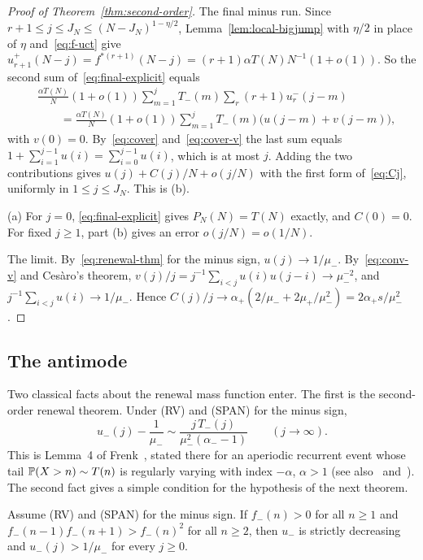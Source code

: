 \begin{proof}[Proof of Theorem~\ref{thm:second-order}]
The final minus run. Since $r+1\le j\le J_N\le(N-J_N)^{1-\eta/2}$,
Lemma~\ref{lem:local-bigjump} with $\eta/2$ in place of $\eta$ and~\eqref{eq:f-uct} give
$u^\plus_{r+1}(N-j)=f^{*(r+1)}(N-j)=(r+1)\alpha T(N)N^{-1}(1+o(1))$. So the second sum
of~\eqref{eq:final-explicit} equals
\begin{align*}
 &\frac{\alpha T(N)}{N}(1+o(1))\sum_{m=1}^{j}T_\minus(m)\sum_r(r+1)u^\minus_r(j-m)\\
 &\qquad=\frac{\alpha T(N)}{N}(1+o(1))\sum_{m=1}^{j}T_\minus(m)\bigl(u(j-m)+v(j-m)\bigr),
\end{align*}
with $v(0)=0$. By~\eqref{eq:cover} and~\eqref{eq:cover-v} the last sum equals
$1+\sum_{i=1}^{j-1}u(i)=\sum_{i=0}^{j-1}u(i)$, which is at most $j$. Adding the two
contributions gives $u(j)+C(j)/N+o(j/N)$ with the first form of~\eqref{eq:Cj}, uniformly
in $1\le j\le J_N$. This is (b).

(a) For $j=0$, \eqref{eq:final-explicit} gives $P_N(N)=T(N)$ exactly, and $C(0)=0$. For
fixed $j\ge1$, part (b) gives an error $o(j/N)=o(1/N)$.

The limit. By~\eqref{eq:renewal-thm} for the minus sign, $u(j)\to1/\mu_\minus$.
By~\eqref{eq:conv-v} and Ces\`aro's theorem, $v(j)/j=j^{-1}\sum_{i<j}u(i)u(j-i)\to\mu_\minus^{-2}$,
and $j^{-1}\sum_{i<j}u(i)\to1/\mu_\minus$. Hence
$C(j)/j\to\alpha_\plus(2/\mu_\minus+2\mu_\plus/\mu_\minus^2)=2\alpha_\plus s/\mu_\minus^2$.
\end{proof}

\subsection{The antimode}\label{sec:antimode}

Two classical facts about the renewal mass function enter. The first is the
second-order renewal theorem. Under (RV) and (SPAN) for the minus sign,
\begin{equation}\label{eq:second-renewal}
 u_\minus(j)-\frac1{\mu_\minus}\sim\frac{j\,T_\minus(j)}{\mu_\minus^2(\alpha_\minus-1)}\qquad(j\to\infty).
\end{equation}
This is Lemma~4 of Frenk~\cite{frenk1982}, stated there for an aperiodic
recurrent event whose tail $\mathbb{P}(X>n)\sim T(n)$ is regularly varying with index
$-\alpha$, $\alpha>1$ (see also~\cite{rogozin1973} and~\cite[Theorem~1]{doney2023}).
The second fact gives a simple
condition for the hypothesis of the next theorem.

\begin{lemma}\label{lem:logconvex}
Assume (RV) and (SPAN) for the minus sign. If $f_\minus(n)>0$ for all $n\ge1$
and $f_\minus(n-1)f_\minus(n+1)>f_\minus(n)^2$ for all $n\ge2$, then $u_\minus$ is
strictly decreasing and $u_\minus(j)>1/\mu_\minus$ for every $j\ge0$.
\end{lemma}

